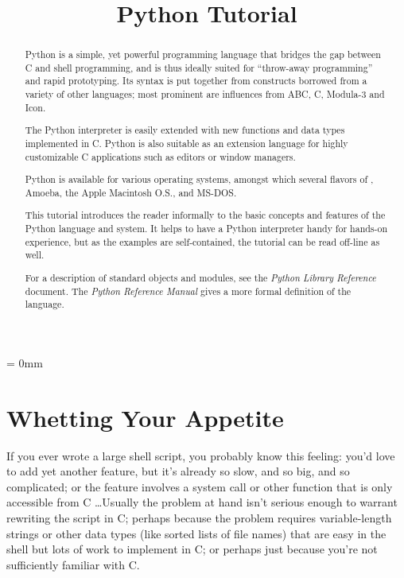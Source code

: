 
\title{Python Tutorial}






\maketitle



\begin{abstract}

\noindent
Python is a simple, yet powerful programming language that bridges the
gap between C and shell programming, and is thus ideally suited for
``throw-away programming''
and rapid prototyping.  Its syntax is put
together from constructs borrowed from a variety of other languages;
most prominent are influences from ABC, C, Modula-3 and Icon.

The Python interpreter is easily extended with new functions and data
types implemented in C.  Python is also suitable as an extension
language for highly customizable C applications such as editors or
window managers.

Python is available for various operating systems, amongst which
several flavors of {\UNIX}, Amoeba, the Apple Macintosh O.S.,
and MS-DOS.

This tutorial introduces the reader informally to the basic concepts
and features of the Python language and system.  It helps to have a
Python interpreter handy for hands-on experience, but as the examples
are self-contained, the tutorial can be read off-line as well.

For a description of standard objects and modules, see the {\em Python
Library Reference} document.  The {\em Python Reference Manual} gives
a more formal definition of the language.

\end{abstract}

\pagebreak
{
\parskip = 0mm
\tableofcontents
}

\pagebreak



\chapter{Whetting Your Appetite}

If you ever wrote a large shell script, you probably know this
feeling: you'd love to add yet another feature, but it's already so
slow, and so big, and so complicated; or the feature involves a system
call or other function that is only accessible from C \ldots  Usually
the problem at hand isn't serious enough to warrant rewriting the
script in C; perhaps because the problem requires variable-length
strings or other data types (like sorted lists of file names) that are
easy in the shell but lots of work to implement in C; or perhaps just
because you're not sufficiently familiar with C.

